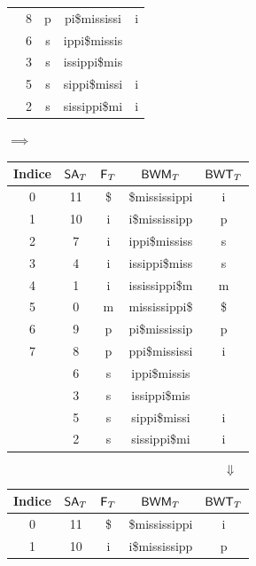 \begin{esempio}
\begin{table}[H]
\begin{tabular}{c|c|c|c|c}
      {\color{nordred}{7}} & 8 & p & {\color{nordred}{p}}pi\$mississi & i\\
      {\color{nordred}{8}} & 6 & s & {\color{nordred}{s}}ippi\$missis
      & {\color{nordgreen}{s}}\\
      {\color{nordred}{9}} & 3 & s & {\color{nordred}{s}}issippi\$mis
      & {\color{nordgreen}{s}}\\
      {\color{nordred}{10}} & 5 & s & {\color{nordred}{s}}sippi\$missi & i\\
      {\color{nordred}{11}} & 2 & s & {\color{nordred}{s}}sissippi\$mi & i\\
    \end{tabular}
    $\implies$
    \begin{tabular}{c|c|c|c|c} 
      \textbf{Indice} & $\mbox{\rm {\sf SA}}_T$ & $\mbox{\rm {\sf F}}_T$ & $\mbox{\rm {\sf BWM}}_T$
      & $\mbox{\rm {\sf BWT}}_T$\\  
      \hline
      0 & 11 & \$ & \$mississippi & i\\
      1 & 10 & i & i\$mississipp & p\\
      2 & 7 & i & ippi\$mississ & s\\
      3 & 4 & i & issippi\$miss & s\\
      4 & 1 & i & ississippi\$m & m\\
      5 & 0 & m & mississippi\$ & \$\\
      6 & 9 & p & pi\$mississip & p\\
      7 & 8 & p & ppi\$mississi & i\\
      {\color{nordred}{8}} & 6 & s & {\color{nordred}{s}}ippi\$missis
      & {\color{nordgreen}{s}}\\
      {\color{nordred}{9}} & 3 & s & {\color{nordred}{s}}issippi\$mis
      & {\color{nordgreen}{s}}\\
      {\color{nordred}{10}} & 5 & s & {\color{nordred}{s}}sippi\$missi & i\\
      {\color{nordred}{11}} & 2 & s & {\color{nordred}{s}}sissippi\$mi & i\\
    \end{tabular}
  \end{table}
  \[\Downarrow\]
  \begin{table}[H]
    \centering
    \scriptsize
    \begin{tabular}{c|c|c|c|c} 
    \textbf{Indice} & $\mbox{\rm {\sf SA}}_T$ & $\mbox{\rm {\sf F}}_T$ & $\mbox{\rm {\sf BWM}}_T$
      & $\mbox{\rm {\sf BWT}}_T$\\ 
      \hline
      0 & 11 & \$ & \$mississippi & i\\
      1 & 10 & i & i\$mississipp & p\\

\end{tabular}
\end{table}
\end{esempio}

